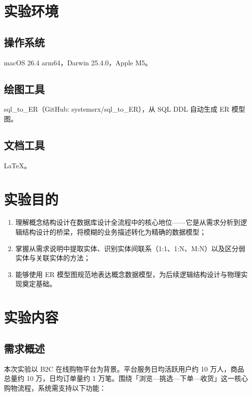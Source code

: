 \documentclass[12pt, a4paper]{academics}
\begin{document}
\makeacademicscover

\section{实验环境}

\subsection{操作系统}

macOS 26.4 arm64，Darwin 25.4.0，Apple M5。

\subsection{绘图工具}

sql\_to\_ER（GitHub: systemsrx/sql\_to\_ER），从 SQL DDL 自动生成 ER 模型图。

\subsection{文档工具}

\LaTeX{}。

\section{实验目的}

\begin{enumerate}
    \item 理解概念结构设计在数据库设计全流程中的核心地位——它是从需求分析到逻辑结构设计的桥梁，将模糊的业务描述转化为精确的数据模型；
    \item 掌握从需求说明中提取实体、识别实体间联系（1:1、1:N、M:N）以及区分弱实体与关联实体的方法；
    \item 能够使用 ER 模型图规范地表达概念数据模型，为后续逻辑结构设计与物理实现奠定基础。
\end{enumerate}

\section{实验内容}

\subsection{需求概述}

本次实验以 B2C 在线购物平台为背景。平台服务日均活跃用户约 10 万人，商品总量约 10 万，日均订单量约 1 万笔。围绕「浏览—挑选—下单—收货」这一核心购物流程，系统需支持以下功能：
\end{document}
